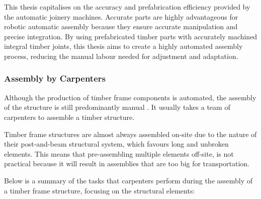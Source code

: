 This thesis capitalises on the accuracy and prefabrication efficiency provided by the automatic joinery machines. Accurate parts are highly advantageous for robotic automatic assembly because they ensure accurate manipulation and precise integration. By using prefabricated timber parts with accurately machined integral timber joints, this thesis aims to create a highly automated assembly process, reducing the manual labour needed for adjustment and adaptation. 

\subsubsection{Assembly by Carpenters}

Although the production of timber frame components is automated, the assembly of the structure is still predominantly manual \parencite{willmannNewParadigmsAutomatic2016}. It usually takes a team of carpenters to assemble a timber structure.

Timber frame structures are almost always assembled on-site due to the nature of their post-and-beam structural system, which favours long and unbroken elements. This means that pre-assembling multiple elements off-site, is not practical because it will result in assemblies that are too big for transportation. 

Below is a summary of the tasks that carpenters perform during the assembly of a timber frame structure, focusing on the structural elements:

